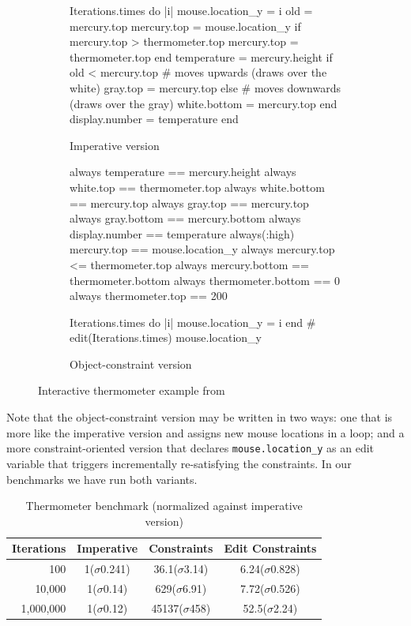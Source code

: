 \begin{figure}[h!]
  \begin{subfigure}[b]{0.48\textwidth}
    \begin{code}[basicstyle=\scriptsize,frame=none]
Iterations.times do |i|
  mouse.location_y = i
  old = mercury.top
  mercury.top = mouse.location_y
  if mercury.top > thermometer.top
    mercury.top = thermometer.top
  end
  temperature = mercury.height
  if old < mercury.top
    # moves upwards (draws over the white)
    gray.top = mercury.top
  else
    # moves downwards (draws over the gray)
    white.bottom = mercury.top
  end
  display.number = temperature
end
    \end{code}
    \caption{Imperative version}
  \end{subfigure}
  \begin{subfigure}[b]{0.52\textwidth}
    \centering
    \begin{code}[basicstyle=\scriptsize,frame=none]
always { temperature == mercury.height }
always { white.top == thermometer.top }
always { white.bottom == mercury.top }
always { gray.top == mercury.top }
always { gray.bottom == mercury.bottom }
always { display.number == temperature }
always(:high) { mercury.top == mouse.location_y }
always { mercury.top <= thermometer.top }
always { mercury.bottom == thermometer.bottom }
always { thermometer.bottom == 0 }
always { thermometer.top == 200 }

Iterations.times do |i|
  mouse.location_y = i
end
# edit(Iterations.times) { mouse.location_y }
    \end{code}
    \caption{Object-constraint version}
  \end{subfigure}
  \caption{Interactive thermometer example from \cite{lopez-asi-1994}}
  \label{fig:thermometer-example}
\end{figure}

Note that the object-constraint version may be written in two ways:
one that is more like the imperative version and assigns new mouse
locations in a loop; and a more constraint-oriented version that
declares \lstinline{mouse.location_y} as an edit variable that
triggers incrementally re-satisfying the constraints. In our benchmarks
we have run both variants.

\begin{table}
  \centering
  \begin{tabular}[h]{r|c c c}
    Iterations & Imperative & Constraints & Edit Constraints \\
    \hline
    100 & 1($\sigma$0.241) & 36.1($\sigma$3.14) & 6.24($\sigma$0.828) \\
    10,000 & 1($\sigma$0.14) & 629($\sigma$6.91) & 7.72($\sigma$0.526) \\
    1,000,000 & 1($\sigma$0.12) & 45137($\sigma$458) & 52.5($\sigma$2.24) \\
  \end{tabular}
  \caption{Thermometer benchmark (normalized against imperative version)}
  \label{fig:thermometer-benchmark}    
\end{table}


